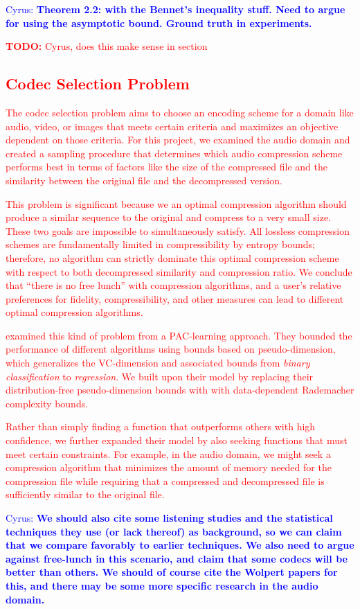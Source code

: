 \documentclass{article}
\newcommand\todo[1]{\textcolor{red}{\textbf{TODO:} #1}}
\newcommand{\cc}[1]{\textcolor{blue}{Cyrus: \textbf{#1}}}
\begin{document}
\cc{Theorem 2.2: with the Bennet's inequality stuff.  Need to argue for using the asymptotic bound.  Ground truth in experiments.}
\todo{Cyrus, does this make sense in section 

\subsection{Codec Selection Problem}
The codec selection problem aims to choose an encoding scheme for a domain like audio, video, or images that meets certain criteria and maximizes an objective dependent on those criteria. For this project, we examined the audio domain and created a sampling procedure that determines which audio compression scheme performs best in terms of factors like the size of the compressed file and the similarity between the original file and the decompressed version. 

This problem is significant because we an optimal compression algorithm should produce a similar sequence to the original and compress to a very small size. These two goals are impossible to simultaneously satisfy. All lossless compression schemes are fundamentally limited in compressibility by entropy bounds; therefore, no algorithm can strictly dominate this optimal compression scheme with respect to both decompressed similarity and compression ratio. We conclude that ``there is no free lunch'' with compression algorithms, and a user's relative preferences for fidelity, compressibility, and other measures can lead to different optimal compression algorithms.

\cite{gupta} examined this kind of problem from a PAC-learning approach. They bounded the performance of different algorithms using bounds based on pseudo-dimension, which generalizes the VC-dimension and associated bounds from \emph{binary classification} to \emph{regression}. We built upon their model by replacing their distribution-free pseudo-dimension bounds with with data-dependent Rademacher complexity bounds.

Rather than simply finding a function that outperforms others with high confidence, we further expanded their model by also seeking functions that must meet certain constraints. For example, in the audio domain, we might seek a compression algorithm that minimizes the amount of memory needed for the compression file while requiring that a compressed and decompressed file is sufficiently similar to the original file. 

\cc{We should also cite some listening studies and the statistical techniques they use (or lack thereof) as background, so we can claim that we compare favorably to earlier techniques.  We also need to argue against free-lunch in this scenario, and claim that some codecs will be better than others.  We should of course cite the Wolpert papers for this, and there may be some more specific research in the audio domain.}

}
\end{document}
